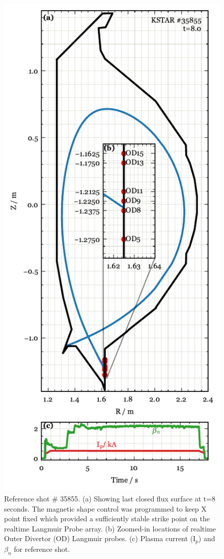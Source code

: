 \begin{figure}[!ht]
 \centering
 \includegraphics[width=\linewidth]{figures/RefShot.pdf}
 \caption{Reference shot \# 35855.
(a) Showing last closed flux surface at t=8 seconds.
The magnetic shape control was programmed to keep X point fixed which provided a sufficiently stable strike point on the realtime Langmuir Probe array.
(b) Zoomed-in locations of realtime Outer Divertor (OD) Langmuir probes.
(c) Plasma current (I$_p$) and $\beta_n$ for reference shot.}
 \label{fig:ref_shot}
\end{figure}

